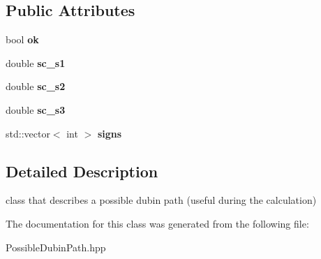 \subsection*{Public Attributes}
\begin{DoxyCompactItemize}
\item 
\mbox{\label{class_possible_dubin_path_afc163a7191f0f0ef7f3ab9e4b9f0475a}} 
bool {\bfseries ok}
\item 
\mbox{\label{class_possible_dubin_path_a30080622e0aa5d77e9bd4e48ce899fd3}} 
double {\bfseries sc\+\_\+s1}
\item 
\mbox{\label{class_possible_dubin_path_a7718b2c4e85c79af611e9730cf64e5c7}} 
double {\bfseries sc\+\_\+s2}
\item 
\mbox{\label{class_possible_dubin_path_a158d88da33832122490ad12569f656d9}} 
double {\bfseries sc\+\_\+s3}
\item 
\mbox{\label{class_possible_dubin_path_a32c2b643e10f119657c1a682c9e8c774}} 
std\+::vector$<$ int $>$ {\bfseries signs}
\end{DoxyCompactItemize}


\subsection{Detailed Description}
class that describes a possible dubin path (useful during the calculation) 

The documentation for this class was generated from the following file\+:\begin{DoxyCompactItemize}
\item 
Possible\+Dubin\+Path.\+hpp\end{DoxyCompactItemize}
